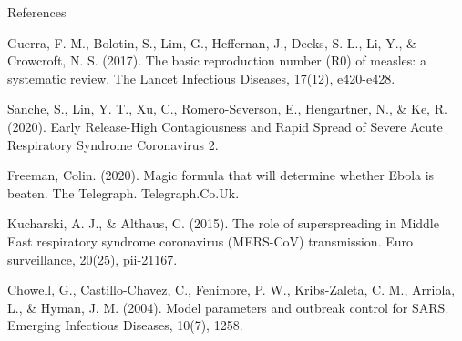 \documentclass{beamer}
\begin{document}
    \begin{frame}{References}
        \footnotesize{
        \begin{thebibliography}{}
       		 Guerra, F. M., Bolotin, S., Lim, G., Heffernan, J., Deeks, S. L., Li, Y., \& Crowcroft, N. S. (2017). The basic reproduction number (R0) of measles: a systematic review. The Lancet Infectious Diseases, 17(12), e420-e428.
       		
       		 Sanche, S., Lin, Y. T., Xu, C., Romero-Severson, E., Hengartner, N., \& Ke, R. (2020). Early Release-High Contagiousness and Rapid Spread of Severe Acute Respiratory Syndrome Coronavirus 2.
       		
       		 Freeman, Colin. (2020). Magic formula that will determine whether Ebola is beaten. The Telegraph. Telegraph.Co.Uk. 
       		
       		 Kucharski, A. J., \& Althaus, C. (2015). The role of superspreading in Middle East respiratory syndrome coronavirus (MERS-CoV) transmission. Euro surveillance, 20(25), pii-21167.
       		
       		 Chowell, G., Castillo-Chavez, C., Fenimore, P. W., Kribs-Zaleta, C. M., Arriola, L., \& Hyman, J. M. (2004). Model parameters and outbreak control for SARS. Emerging Infectious Diseases, 10(7), 1258.
        \end{thebibliography}
    }
    \end{frame}
    
\end{document}
